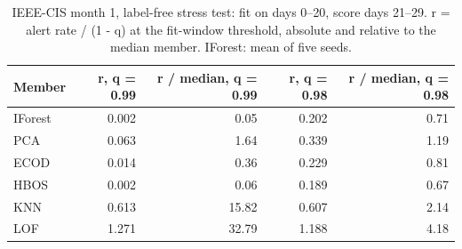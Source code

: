 \begin{table}[t]
\centering
\small
\caption{IEEE-CIS month 1, label-free stress test: fit on days 0--20, score days 21--29. r = alert rate / (1 - q) at the fit-window threshold, absolute and relative to the median member. IForest: mean of five seeds.}
\label{tab:ieee-stress-month1}
\begin{tabular}{lrrrr}
\toprule
Member & r, q = 0.99 & r / median, q = 0.99 & r, q = 0.98 & r / median, q = 0.98 \\
\midrule
IForest & 0.002 & 0.05 & 0.202 & 0.71 \\
PCA & 0.063 & 1.64 & 0.339 & 1.19 \\
ECOD & 0.014 & 0.36 & 0.229 & 0.81 \\
HBOS & 0.002 & 0.06 & 0.189 & 0.67 \\
KNN & 0.613 & 15.82 & 0.607 & 2.14 \\
LOF & 1.271 & 32.79 & 1.188 & 4.18 \\
\bottomrule
\end{tabular}
\end{table}
